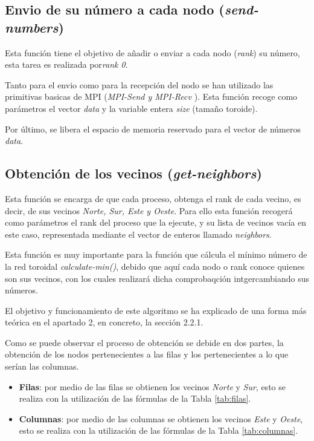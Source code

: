 \documentclass[11pt]{article}
\begin{document}





\subsection{Envio de su número a cada nodo (\textit{send-numbers})}
Esta función tiene el objetivo de añadir o enviar a cada nodo (\textit{rank}) \cite{mpi_rank} su número, esta tarea es realizada por\textit{rank 0}.

Tanto para el envio como para la recepción del nodo se han utilizado las primitivas basicas de MPI (\textit{MPI-Send \cite{mpi_send} y MPI-Recv \cite{mpi_recv}}).
Esta función recoge como parámetros el vector \textit{data} y la variable entera \textit{size} (tamaño toroide).



Por último, se libera el espacio de memoria reservado para el vector de números \textit{data}.


\subsection{Obtención de los vecinos (\textit{get-neighbors})}
Esta función se encarga de que cada proceso, obtenga el rank de cada vecino, es decir, de sus vecinos \textit{Norte, Sur, Este y Oeste}. Para ello esta función recogerá como parámetros el rank del proceso que la ejecute, y su lista de vecinos vacía en este caso, representada mediante el vector de enteros llamado \textit{neighbors}.

Esta función es muy importante para la función que cálcula el mínimo número de la red toroidal \textit{calculate-min()}, debido que aquí cada nodo o rank conoce quienes son sus vecinos, con los cuales realizará dicha comprobaqción intgercambiando sus números.

El objetivo y funcionamiento de este algoritmo se ha explicado de una forma más teórica en el apartado 2, en concreto, la sección 2.2.1.



Como se puede observar el proceso de obtención se debide en dos partes, la obtención de los nodos pertenecientes a las filas y los pertenecientes a lo que serían las columnas.

\begin{itemize}
	\item \textbf{Filas}: por medio de las filas se obtienen los vecinos \textit{Norte} y \textit{Sur}, esto se realiza con la utilización de las fórmulas de la Tabla \ref{tab:filas}.
	\item \textbf{Columnas}: por medio de las columnas se obtienen los vecinos \textit{Este} y \textit{Oeste}, esto se realiza con la utilización de las fórmulas de la Tabla \ref{tab:columnas}.
\end{itemize}
\end{document}
